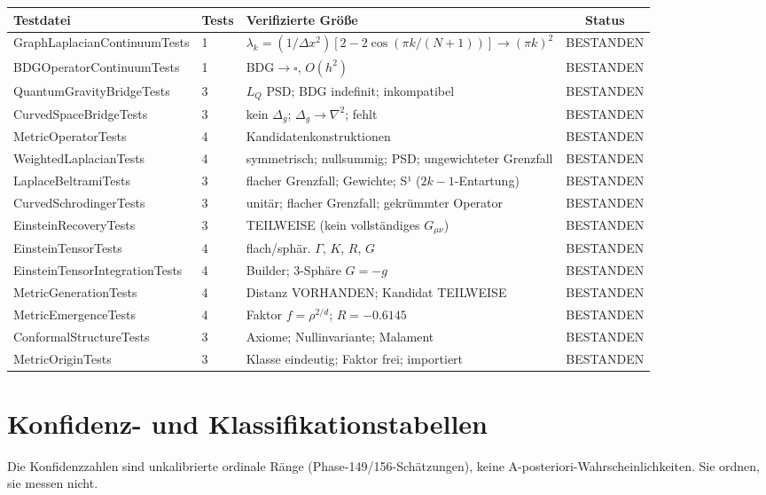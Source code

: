 \documentclass[10pt,twoside,openany]{book}
\begin{document}
\begin{longtable}{lllc}
\toprule
Testdatei & Tests & Verifizierte Größe & Status \\
\midrule
\endhead
GraphLaplacianContinuumTests & 1 & $\lambda_k=(1/\Delta x^2)[2-2\cos(\pi k/(N{+}1))]\to(\pi k)^2$ & BESTANDEN \\
BDGOperatorContinuumTests & 1 & BDG$\to\square$, $O(h^2)$ & BESTANDEN \\
QuantumGravityBridgeTests & 3 & $L_Q$ PSD; BDG indefinit; inkompatibel & BESTANDEN \\
CurvedSpaceBridgeTests & 3 & kein $\Delta_g$; $\Delta_g\to\nabla^2$; fehlt & BESTANDEN \\
MetricOperatorTests & 4 & Kandidatenkonstruktionen & BESTANDEN \\
WeightedLaplacianTests & 4 & symmetrisch; nullsummig; PSD; ungewichteter Grenzfall & BESTANDEN \\
LaplaceBeltramiTests & 3 & flacher Grenzfall; Gewichte; S¹ ($2k{-}1$-Entartung) & BESTANDEN \\
CurvedSchrodingerTests & 3 & unitär; flacher Grenzfall; gekrümmter Operator & BESTANDEN \\
EinsteinRecoveryTests & 3 & TEILWEISE (kein vollständiges $G_{\mu\nu}$) & BESTANDEN \\
EinsteinTensorTests & 4 & flach/sphär. $\Gamma$, $K$, $R$, $G$ & BESTANDEN \\
EinsteinTensorIntegrationTests & 4 & Builder; 3-Sphäre $G=-g$ & BESTANDEN \\
MetricGenerationTests & 4 & Distanz VORHANDEN; Kandidat TEILWEISE & BESTANDEN \\
MetricEmergenceTests & 4 & Faktor $f=\rho^{2/d}$; $R=-0.6145$ & BESTANDEN \\
ConformalStructureTests & 3 & Axiome; Nullinvariante; Malament & BESTANDEN \\
MetricOriginTests & 3 & Klasse eindeutig; Faktor frei; importiert & BESTANDEN \\
\bottomrule
\end{longtable}

\chapter{Konfidenz- und Klassifikationstabellen}
\label{app:confidence}

Die Konfidenzzahlen sind unkalibrierte ordinale Ränge (Phase-149/156-Schätzungen), keine
A-posteriori-Wahrscheinlichkeiten. Sie ordnen, sie messen nicht.
\end{document}
